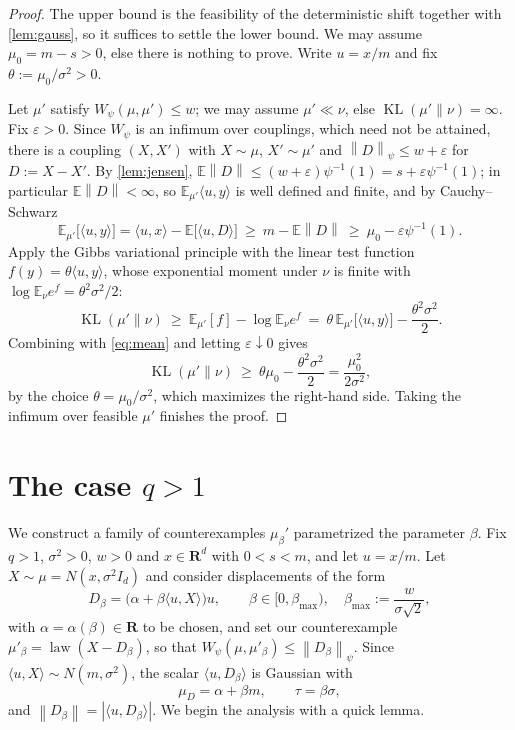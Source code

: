 \documentclass[11pt,reqno]{amsart}
\theoremstyle{definition}
\theoremstyle{remark}
\def\R{\mathbf{R}}
\newcommand\opr[1]{\operatorname{#1}}
\newcommand{\ee}{\mathbb{E}}
\def\KL{\opr{KL}}
\newcommand{\norm}[1]{\left\lVert#1\right\rVert}
\numberwithin{equation}{section}
\begin{document}
\begin{proof}
The upper bound is the feasibility of the deterministic shift together with \cref{lem:gauss}, so it suffices to settle the lower bound. We may assume $\mu_0=m-s>0$, else there is nothing to prove. Write $u=x/m$ and fix $\theta:=\mu_0/\sigma^2>0$.

Let $\mu'$ satisfy $W_{\psi}(\mu,\mu')\le w$; we may assume $\mu'\ll\nu$, else $\KL(\mu'\|\nu)=\infty$. Fix $\varepsilon>0$. Since $W_\psi$ is an infimum over couplings, which need not be attained, there is a coupling $(X,X')$ with $X\sim\mu$, $X'\sim\mu'$ and $\norm{D}_{\psi}\le w+\varepsilon$ for $D:=X-X'$. By \cref{lem:jensen}, $\ee\norm{D}\le (w+\varepsilon)\psi^{-1}(1)=s+\varepsilon\psi^{-1}(1)$; in particular $\ee\norm{D}<\infty$, so $\ee_{\mu'}\langle u,y\rangle$ is well defined and finite, and by Cauchy--Schwarz
\begin{equation}\label{eq:mean}
\ee_{\mu'}\big[\langle u,y\rangle\big]=\langle u,x\rangle-\ee\big[\langle u,D\rangle\big]\ \ge\ m-\ee\norm{D}\ \ge\ \mu_0-\varepsilon\psi^{-1}(1).
\end{equation}
Apply the Gibbs variational principle with the linear test function $f(y)=\theta\langle u,y\rangle$, whose exponential moment under $\nu$ is finite with $\log\ee_\nu e^{f}=\theta^2\sigma^2/2$:
$$\KL(\mu'\|\nu)\ \ge\ \ee_{\mu'}[f]-\log\ee_{\nu}e^{f}\ =\ \theta\,\ee_{\mu'}\big[\langle u,y\rangle\big]-\frac{\theta^2\sigma^2}{2}.$$
Combining with \eqref{eq:mean} and letting $\varepsilon\downarrow 0$ gives
$$\KL(\mu'\|\nu)\ \ge\ \theta\mu_0-\frac{\theta^2\sigma^2}{2}=\frac{\mu_0^2}{2\sigma^2},$$
by the choice $\theta=\mu_0/\sigma^2$, which maximizes the right-hand side. Taking the infimum over feasible $\mu'$ finishes the proof.
\end{proof}

\section{The case \texorpdfstring{$q>1$}{q>1}}

We construct a family of counterexamples $\mu_{\beta}'$ parametrized the parameter $\beta$. Fix $q>1$, $\sigma^2>0$, $w>0$ and $x\in\R^d$ with $0<s<m$, and let $u=x/m$. Let $X\sim\mu=N(x,\sigma^2I_d)$ and consider displacements of the form
\begin{equation}\label{eq:family}
D_\beta=\big(\alpha+\beta\langle u,X\rangle\big)u,\qquad \beta\in[0,\beta_{\max}),\quad \beta_{\max}:=\frac{w}{\sigma\sqrt2},
\end{equation}
with $\alpha=\alpha(\beta)\in\R$ to be chosen, and set our counterexample $\mu'_\beta=\opr{law}(X-D_\beta)$, so that $W_\psi(\mu,\mu'_\beta)\le \norm{D_\beta}_\psi$. Since $\langle u,X\rangle\sim N(m,\sigma^2)$, the scalar $\langle u,D_\beta\rangle$ is Gaussian with
$$\mu_D=\alpha+\beta m,\qquad \tau=\beta\sigma,$$
and $\norm{D_\beta}=|\langle u,D_\beta\rangle|$. We begin the analysis with a quick lemma.
\end{document}
